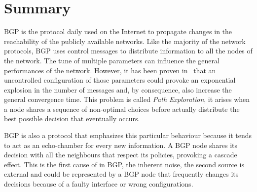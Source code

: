 \chapter*{Summary} %
\label{cha:summary}




\ac{BGP} is the protocol daily used on the Internet to propagate changes in the
reachability of the publicly available networks.
Like the majority of the network protocols, \ac{BGP} uses control messages to
distribute information to all the nodes of the network.
The tune of multiple parameters can influence the general performances of the
network.
However, it has been proven in~\cite{fabrikant2011there} that an uncontrolled configuration
of those parameters could provoke an exponential explosion in the number of messages
and, by consequence, also increase the general convergence time.
This problem is called \textit{Path Exploration}, it arises when a node shares
a sequence of non-optimal choices before actually distribute the best possible
decision that eventually occurs.

\ac{BGP} is also a protocol that emphasizes this particular behaviour because
it tends to act as an echo-chamber for every new information.
A \ac{BGP} node shares its decision with all the neighbours that respect
its policies, provoking a cascade effect.
This is the first cause of  in \ac{BGP}, the inherent noise, the second
source is external and could be represented by a \ac{BGP} node that frequently
changes its decisions because of a faulty interface or wrong configurations.

